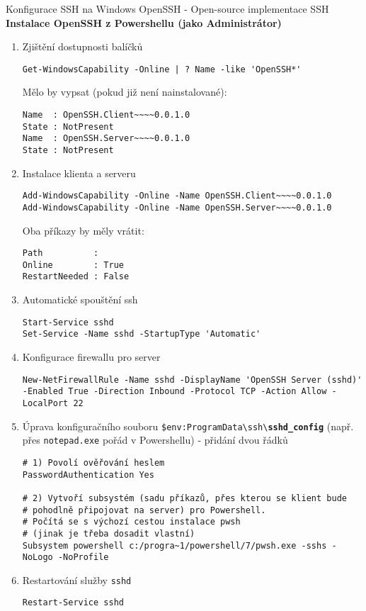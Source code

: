 \documentclass[main.tex]{subfiles}
\begin{document}
\begin{frame}{Konfigurace SSH na Windows}
  OpenSSH - Open-source implementace SSH\\

  \textbf{Instalace OpenSSH z Powershellu (jako Administrátor)}
\begin{enumerate}
  \item Zjištění dostupnosti balíčků
\begin{verbatim}
Get-WindowsCapability -Online | ? Name -like 'OpenSSH*'
\end{verbatim}
Mělo by vypsat (pokud již není nainstalované):
\begin{verbatim}
Name  : OpenSSH.Client~~~~0.0.1.0
State : NotPresent
Name  : OpenSSH.Server~~~~0.0.1.0
State : NotPresent
\end{verbatim}
\framebreak
\item Instalace klienta a serveru
\begin{verbatim}
Add-WindowsCapability -Online -Name OpenSSH.Client~~~~0.0.1.0
Add-WindowsCapability -Online -Name OpenSSH.Server~~~~0.0.1.0
\end{verbatim}
Oba příkazy by měly vrátit:
\begin{verbatim}
Path          :
Online        : True
RestartNeeded : False
\end{verbatim}
\framebreak
\item Automatické spouštění ssh
\begin{verbatim}
Start-Service sshd
Set-Service -Name sshd -StartupType 'Automatic'
\end{verbatim}
\item Konfigurace firewallu pro server
\begin{verbatim}
New-NetFirewallRule -Name sshd -DisplayName 'OpenSSH Server (sshd)' -Enabled True -Direction Inbound -Protocol TCP -Action Allow -LocalPort 22
  \end{verbatim}
\item Úprava konfiguračního souboru \texttt{\$env:ProgramData\textbackslash ssh\textbackslash \textbf{sshd\_config}} (např. přes \texttt{notepad.exe} pořád v Powershellu) - přidání dvou řádků
      \scriptsize\begin{verbatim}
# 1) Povolí ověřování heslem
PasswordAuthentication Yes

# 2) Vytvoří subsystém (sadu příkazů, přes kterou se klient bude
# pohodlně připojovat na server) pro Powershell.
# Počítá se s výchozí cestou instalace pwsh
# (jinak je třeba dosadit vlastní)
Subsystem powershell c:/progra~1/powershell/7/pwsh.exe -sshs -NoLogo -NoProfile\end{verbatim}
\normalsize
{}
\item Restartování služby \texttt{sshd}
\begin{verbatim}
Restart-Service sshd
\end{verbatim}
  \end{enumerate}
\end{frame}
\end{document}
